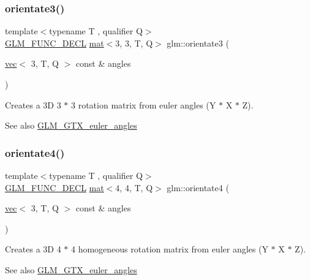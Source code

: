 \subsubsection{\texorpdfstring{orientate3()}{orientate3()}\hspace{0.1cm}{\footnotesize\ttfamily [2/2]}}
{\footnotesize\ttfamily template$<$typename T , qualifier Q$>$ \\
\mbox{\hyperlink{setup_8hpp_ab2d052de21a70539923e9bcbf6e83a51}{G\+L\+M\+\_\+\+F\+U\+N\+C\+\_\+\+D\+E\+CL}} \mbox{\hyperlink{structglm_1_1mat}{mat}}$<$3, 3, T, Q$>$ glm\+::orientate3 (\begin{DoxyParamCaption}\item[{\mbox{\hyperlink{structglm_1_1vec}{vec}}$<$ 3, T, Q $>$ const \&}]{angles }\end{DoxyParamCaption})}

Creates a 3D 3 $\ast$ 3 rotation matrix from euler angles (Y $\ast$ X $\ast$ Z). \begin{DoxySeeAlso}{See also}
\mbox{\hyperlink{group__gtx__euler__angles}{G\+L\+M\+\_\+\+G\+T\+X\+\_\+euler\+\_\+angles}} 
\end{DoxySeeAlso}
\mbox{\label{group__gtx__euler__angles_ga4a044653f71a4ecec68e0b623382b48a}} 
\subsubsection{\texorpdfstring{orientate4()}{orientate4()}}
{\footnotesize\ttfamily template$<$typename T , qualifier Q$>$ \\
\mbox{\hyperlink{setup_8hpp_ab2d052de21a70539923e9bcbf6e83a51}{G\+L\+M\+\_\+\+F\+U\+N\+C\+\_\+\+D\+E\+CL}} \mbox{\hyperlink{structglm_1_1mat}{mat}}$<$4, 4, T, Q$>$ glm\+::orientate4 (\begin{DoxyParamCaption}\item[{\mbox{\hyperlink{structglm_1_1vec}{vec}}$<$ 3, T, Q $>$ const \&}]{angles }\end{DoxyParamCaption})}

Creates a 3D 4 $\ast$ 4 homogeneous rotation matrix from euler angles (Y $\ast$ X $\ast$ Z). \begin{DoxySeeAlso}{See also}
\mbox{\hyperlink{group__gtx__euler__angles}{G\+L\+M\+\_\+\+G\+T\+X\+\_\+euler\+\_\+angles}} 
\end{DoxySeeAlso}
\mbox{\label{group__gtx__euler__angles_gae6aa26ccb020d281b449619e419a609e}} 
